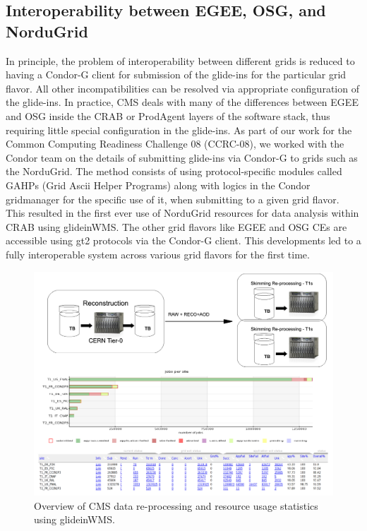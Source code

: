 \documentclass[a4paper]{jpconf}
\begin{document}
\subsection {Interoperability between EGEE, OSG, and NorduGrid}
In principle, the problem of interoperability between different grids is reduced to having a Condor-G client
for submission of the glide-ins for the particular grid flavor. All other incompatibilities can be 
resolved via appropriate configuration of the glide-ins. In practice, CMS deals with many of the differences 
between EGEE and OSG inside the CRAB or ProdAgent layers of the software stack, thus requiring little special 
configuration in the glide-ins. As part of our work for the Common Computing Readiness Challenge 08 (CCRC-08), we worked 
with the Condor team on the details of submitting glide-ins via Condor-G to grids such as the NorduGrid. The method 
consists of using protocol-specific modules called GAHPs (Grid Ascii Helper Programs) along with logics in the Condor gridmanager for the 
specific use of it, when submitting to a given grid flavor. This resulted 
in the first ever use of NorduGrid resources for data analysis within CRAB using glideinWMS. The other grid flavors like 
EGEE and OSG CEs are accessible using gt2 protocols via the Condor-G client. This developments led to
a fully interoperable system across various grid flavors for the first time.
\begin{figure}
\begin{center}
\includegraphics[scale=0.5]{DataReprocess}
\end{center}
\caption{Overview of CMS data re-processing and resource usage statistics using glideinWMS.}
\label{fig:reprocessT1s}
\end{figure}
\end{document}
